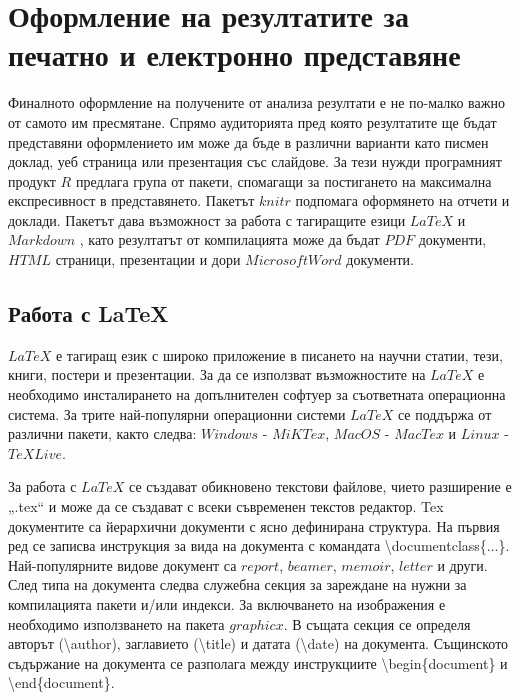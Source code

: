 \newpage
\chapter{Оформление на резултатите за печатно и електронно представяне}
\label{chapter11}
\thispagestyle{empty}

Финалното оформление на получените от анализа резултати е не по-малко важно от самото им пресмятане. Спрямо аудиторията пред която резултатите ще бъдат представяни оформлението им може да бъде в различни варианти като писмен доклад, уеб страница или презентация със слайдове. За тези нужди програмният продукт $R$ предлага група от пакети, спомагащи за постигането на максимална експресивност в представянето. Пакетът $knitr$ подпомага оформянето на отчети и доклади. Пакетът дава възможност за работа с тагиращите езици $LaTeX$ и $Markdown$ \cite{markdown}, като резултатът от компилацията може да бъдат $PDF$ документи, $HTML$ \cite{html} страници, презентации и дори $Microsoft Word$ документи. 

\section{Работа с LaTeX}

$LaTeX$ \cite{latex} е тагиращ език с широко приложение в писането на научни статии, тези, книги, постери и презентации. За да се използват възможностите на $LaTeX$ е необходимо инсталирането на допълнителен софтуер за съответната операционна система. За трите най-популярни операционни системи $LaTeX$ се поддържа от различни пакети, както следва: $Windows$ - $MiKTex$, $MacOS$ - $MacTex$ и $Linux$ - $TeX Live$.

За работа с $LaTeX$ се създават обикновено текстови файлове, чието разширение е „.tex“ и може да се създават с всеки съвременен текстов редактор. Tex документите са йерархични документи с ясно дефинирана структура. На първия ред се записва инструкция за вида на документа с командата \textbackslash documentclass\{...\}. Най-популярните видове документ са $report$, $beamer$, $memoir$, $letter$ и други. След типа на документа следва служебна секция за зареждане на нужни за компилацията пакети и/или индекси. За включването на изображения е необходимо използването на пакета $graphicx$. В същата секция се определя авторът (\textbackslash author), заглавието (\textbackslash title) и датата (\textbackslash date) на документа. Същинското съдържание на документа се разполага между инструкциите \textbackslash begin\{document\} и \textbackslash end\{document\}.

